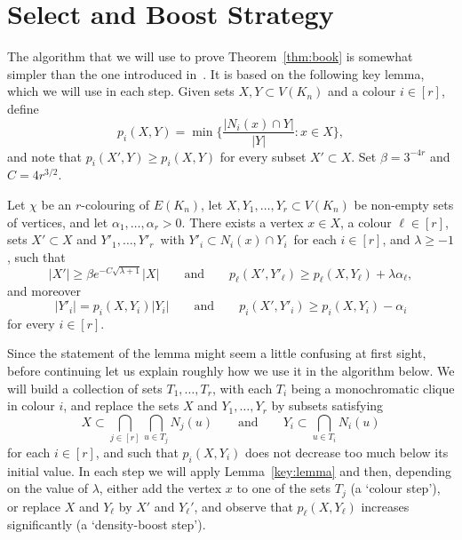 \section{Select and Boost Strategy}\label{sec:algorithm}

The algorithm that we will use to prove Theorem~\ref{thm:book} is somewhat simpler than the one introduced in~\cite{CGMS}. It is based on the following key lemma, which we will use in each step. Given sets $X,Y \subset V(K_n)$ and a colour $i \in [r]$, define 
$$p_i(X,Y) = \min\bigg\{ \frac{|N_i(x) \cap Y|}{|Y|} : x \in X \bigg\},$$
and note that $p_i(X',Y) \ge p_i(X,Y)$ for every subset $X' \subset X$. Set $\beta = 3^{-4r}$ and $C = 4r^{3/2}$.
 
\begin{lemma}\label{key:lemma}
Let\/ $\chi$ be an\/ $r$-colouring of\/ $E(K_n)$, let\/ $X,Y_1,\ldots,Y_r \subset V(K_n)$ be non-empty sets of vertices, and let $\alpha_1,\ldots,\alpha_r > 0$. There exists a vertex $x \in X$, a colour $\ell \in [r]$, sets $X' \subset X$ and\/ $Y'_1,\ldots,Y'_r\,$ with\/ $Y'_i \subset N_i(x) \cap Y_i\,$ for each $i \in [r]$, and\/ $\lambda \ge -1$, such that 
\begin{equation}\label{eq:key:ell}
|X'| \ge \beta e^{- C \sqrt{\lambda + 1}} |X| \qquad \text{and} \qquad p_\ell( X', Y'_\ell ) \ge p_\ell(X,Y_\ell) + \lambda \alpha_\ell,
\end{equation}
and moreover
\begin{equation}\label{eq:key:alli}
|Y'_i| = p_i(X,Y_i) |Y_i| \qquad \text{and} \qquad p_i( X', Y'_i ) \ge p_i(X,Y_i) - \alpha_i
\end{equation}
for every $i \in [r]$.
\end{lemma}

Since the statement of the lemma might seem a little confusing at first sight, before continuing let us explain roughly how we use it in the algorithm below. We will build a collection of sets $T_1,\ldots,T_r$, with each $T_i$ being a monochromatic clique in colour $i$, and replace the sets $X$ and $Y_1,\ldots,Y_r$ by subsets satisfying
$$X \subset \bigcap_{j \in [r]} \bigcap_{u \in T_j} N_j(u) \qquad \text{and} \qquad Y_i \subset \bigcap_{u \in T_i} N_i(u)$$
for each $i \in [r]$, and such that $p_i(X,Y_i)$ does not decrease too much below its initial value. In each step we will apply Lemma~\ref{key:lemma} and then, depending on the value of $\lambda$, either add the vertex $x$ to one of the sets $T_j$ (a `colour step'), or replace $X$ and $Y_\ell$ by $X'$ and $Y_\ell'$, and observe that $p_\ell(X,Y_\ell)$ increases significantly (a `density-boost step'). 

